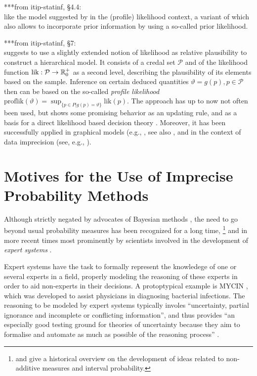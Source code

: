 ***from itip-statinf, \S 4.4:\\
like the model suggested by \textcite{2008:cattaneo} in the (profile) likelihood context,
a variant of which also allows to incorporate prior information by using a so-called prior likelihood.

***from itip-statinf, \S 7:\\
\textcite{2008:cattaneo} suggests to use a slightly extended notion of likelihood as relative plausibility to construct a hierarchical model.
It consists of a credal set $\mathcal{P}$ and of the likelihood function $\text{lik}: {\cal P} \to \mathbb{R}_0^+$ as a second level,
describing the plausibility of its elements based on the sample.
Inference on certain deduced quantities $\vartheta=g\left(p\right), p \in \mathcal{P}$
then can be based on the so-called \emph{profile likelihood}
$\text{proflik} \left(\vartheta\right) = \sup_{\{p \in P \vert g\left(p\right)=\vartheta\}} \text{lik}\left(p\right)$.
The approach has up to now not often been used, but shows some promising behavior as an updating rule,
and as a basis for a direct likelihood based decision theory \parencite{2007a:cattaneo, 2012:cattaneo-technicalRep}.
Moreover, it has been successfully applied in graphical models (e.g., \cite{2011:4:isipta},
see also \cite[\S 4.3]{itip-classification}, and in the context of data imprecision
(see, e.g., \cite[\S 8.1]{itip-statinf}).


\section{Motives for the Use of Imprecise Probability Methods}
\label{sec:motivation}

Although strictly negated by advocates of Bayesian methods \parencite[e.g., by][]{1987:lindley},
the need to go beyond usual probability measures has been recognized for a long time,%
\footnote{\textcite{2009:hampel} and \textcite[\S 1]{2001:weichselberger} give a historical overview on the development of
ideas related to non-additive measures and interval probability.}
and in more recent times most prominently by scientists involved in the development of \emph{expert systems}
\parencite[see, e.g.,][]{1996:walley::expert}.%

Expert systems have the task to formally represent the knowledege of one or several experts in a field,
properly modeling the reasoning of these experts in order to aid non-experts in their decisions.
A protoptypical example is MYCIN \parencite{1976:shortliffe},
which was developed to assist physicians in diagnosing bacterial infections.
The reasoning to be modeled by expert systems typically involes
``uncertainty, partial ignorance and incomplete or conflicting information'', and thus provides
``an especially good testing ground for theories of uncertainty
because they aim to formalise and automate as much as possible
of the reasoning process'' \parencite[p.~2]{1996:walley::expert}.

